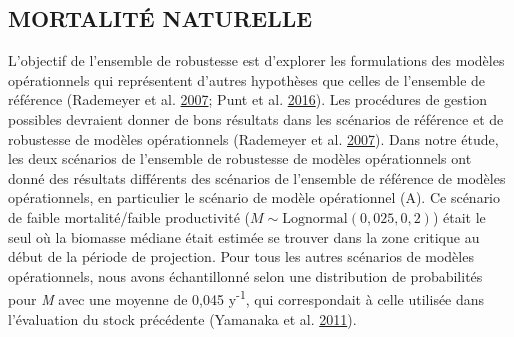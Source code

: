\documentclass[french,11pt]{book}
\begin{document}
\hypertarget{sec:discussion-m}{%
\subsection{MORTALITÉ NATURELLE}\label{sec:discussion-m}}

L'objectif de l'ensemble de robustesse est d'explorer les formulations des modèles opérationnels qui représentent d'autres hypothèses que celles de l'ensemble de référence (Rademeyer et al. \protect\hyperlink{ref-rademeyer2007}{2007}; Punt et al. \protect\hyperlink{ref-punt2016}{2016}). Les procédures de gestion possibles devraient donner de bons résultats dans les scénarios de référence et de robustesse de modèles opérationnels (Rademeyer et al. \protect\hyperlink{ref-rademeyer2007}{2007}). Dans notre étude, les deux scénarios de l'ensemble de robustesse de modèles opérationnels ont donné des résultats différents des scénarios de l'ensemble de référence de modèles opérationnels, en particulier le scénario de modèle opérationnel (A). Ce scénario de faible mortalité/faible productivité (\(M \sim \textrm{Lognormal}(0,025, 0,2)\)) était le seul où la biomasse médiane était estimée se trouver dans la zone critique au début de la période de projection. Pour tous les autres scénarios de modèles opérationnels, nous avons échantillonné selon une distribution de probabilités pour \emph{M} avec une moyenne de 0,045 y\textsuperscript{-1}, qui correspondait à celle utilisée dans l'évaluation du stock précédente (Yamanaka et al. \protect\hyperlink{ref-yamanaka2011}{2011}).
\end{document}
